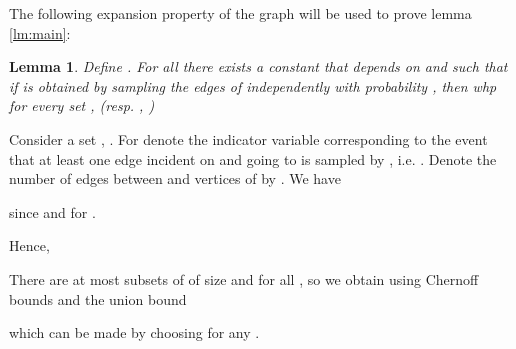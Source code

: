 \documentclass[11pt]{article}
\newtheorem{lemma}[theorem]{Lemma}
\newenvironment{proof}{{\bf Proof:}}{\par}
\begin{document}
The following expansion property of the graph  will be used to prove lemma \ref{lm:main}:
\begin{lemma} \label{lm:expansion}
Define . For all  there exists a constant  that depends on  and  such that if  is obtained by sampling the edges of  independently with probability , then whp for every set ,  (resp. , ) 

\end{lemma}
\begin{proof}
Consider a set , . For  denote the indicator variable corresponding to the event that at least one edge incident on  and going to  is sampled by , i.e. . Denote the number of edges between  and vertices of  by . We have 

since  and  for .

Hence, 


There are at most  subsets  of  of size  and  for all , so we obtain using Chernoff bounds and the union bound

which can be made  by choosing  for any .
\end{proof}
\end{document}
